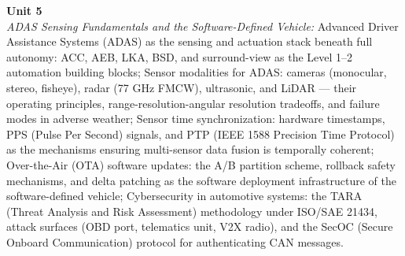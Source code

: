 \vspace{0.3cm}

\noindent\textbf{Unit 5} \\
\textit{ADAS Sensing Fundamentals and the Software-Defined Vehicle:} Advanced Driver Assistance Systems (ADAS) as the sensing and actuation stack beneath full autonomy: ACC, AEB, LKA, BSD, and surround-view as the Level 1--2 automation building blocks; Sensor modalities for ADAS: cameras (monocular, stereo, fisheye), radar (77 GHz FMCW), ultrasonic, and LiDAR — their operating principles, range-resolution-angular resolution tradeoffs, and failure modes in adverse weather; Sensor time synchronization: hardware timestamps, PPS (Pulse Per Second) signals, and PTP (IEEE 1588 Precision Time Protocol) as the mechanisms ensuring multi-sensor data fusion is temporally coherent; Over-the-Air (OTA) software updates: the A/B partition scheme, rollback safety mechanisms, and delta patching as the software deployment infrastructure of the software-defined vehicle; Cybersecurity in automotive systems: the TARA (Threat Analysis and Risk Assessment) methodology under ISO/SAE 21434, attack surfaces (OBD port, telematics unit, V2X radio), and the SecOC (Secure Onboard Communication) protocol for authenticating CAN messages.

\newpage
{}
